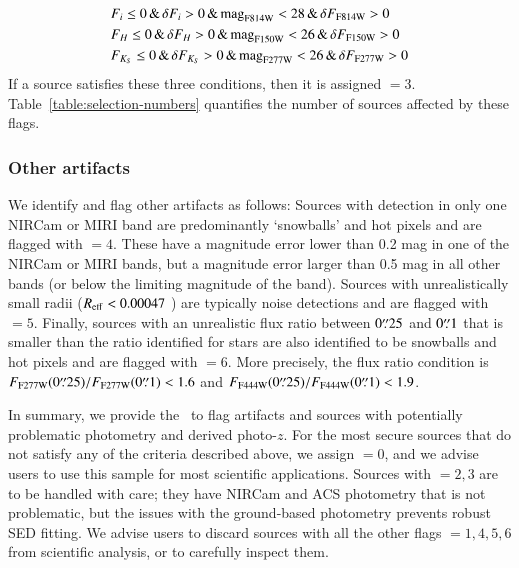 \documentclass[longauth]{aa}
\begin{document}
\begin{equation}\label{condition_warn_fl_2}
\begin{split} 
& F_{i} \leq 0 \, \& \, \delta F_{i} > 0  \, \& \, {\rm mag}_{\rm F814W} < 28 \, \& \, \delta F_{\rm F814W} > 0 \\
& F_{H} \leq 0 \, \& \, \delta F_{H} > 0  \, \& \, {\rm mag}_{\rm F150W} < 26 \, \& \, \delta F_{\rm F150W} > 0 \\
& F_{K_S} \leq 0 \, \& \, \delta F_{K_S} > 0  \, \& \, {\rm mag}_{\rm F277W} < 26 \, \& \, \delta F_{\rm F277W} > 0 
\end{split}
\end{equation}
If a source satisfies these three conditions, then it is assigned \warnfl$=3$. Table~\ref{table:selection-numbers} quantifies the number of sources affected by these flags.

\subsubsection{Other artifacts} 
We identify and flag other artifacts as follows: 
Sources with detection in only one NIRCam or MIRI band are predominantly `snowballs' and hot pixels and are flagged with \warnfl$=4$. These have a  magnitude error lower than 0.2 mag in one of the NIRCam or MIRI bands, but a magnitude error larger than 0.5 mag in all other bands (or below the limiting magnitude of the band). Sources with unrealistically small radii ($R_{\rm eff}<0.00047$ \ang{;;}) are typically noise detections and are flagged with \warnfl$=5$.
Finally, sources with an unrealistic flux ratio between $0{\overset{\prime\prime}{.}}25$ and $0{\overset{\prime\prime}{.}}1$ that is smaller than the ratio identified for stars are also identified to be snowballs and hot pixels and are flagged with \warnfl$=6$. More precisely, the flux ratio condition is $F_{\rm F277W}(0{\overset{\prime\prime}{.}}25)/F_{\rm F277W}(0{\overset{\prime\prime}{.}}1) < 1.6$ and $F_{\rm F444W}(0{\overset{\prime\prime}{.}}25)/F_{\rm F444W}(0{\overset{\prime\prime}{.}}1) < 1.9$.

In summary, we provide the \warnfl\ to flag artifacts and sources with potentially problematic photometry and derived photo-$z$. For the most secure sources that do not satisfy any of the criteria described above, we assign \warnfl$=0$, and we advise users to use this sample for most scientific applications. Sources with \warnfl$=2,3$ are to be handled with care; they have NIRCam and ACS photometry that is not problematic, but the issues with the ground-based photometry prevents robust SED fitting. We advise users to discard sources with all the other flags \warnfl$=1,4,5,6$ from scientific analysis, or to carefully inspect them.
\end{document}
